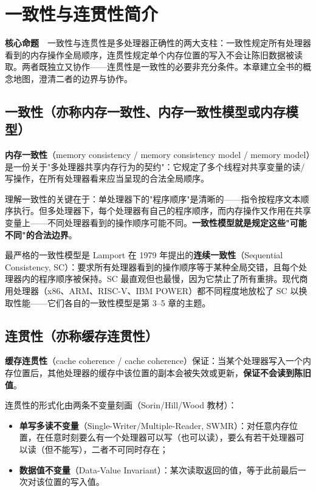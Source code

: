 \chapter{一致性与连贯性简介}

\begin{epigraph}
\textbf{核心命题}　一致性与连贯性是多处理器正确性的两大支柱：一致性规定所有处理器看到的内存操作全局顺序，连贯性规定单个内存位置的写入不会让陈旧数据被读取。两者既独立又协作——连贯性是一致性的必要非充分条件。本章建立全书的概念地图，澄清二者的边界与协作。
\end{epigraph}



\section{一致性（亦称内存一致性、内存一致性模型或内存模型）}

\textbf{内存一致性}（memory consistency / memory consistency model / memory model）是一份关于"多处理器共享内存行为的契约"：它规定了多个线程对共享变量的读/写操作，在所有处理器看来应当呈现的合法全局顺序。

理解一致性的关键在于：单处理器下的"程序顺序"是清晰的——指令按程序文本顺序执行。但多处理器下，每个处理器有自己的程序顺序，而内存操作又作用在共享变量上——不同处理器看到的操作顺序可能不同。\textbf{一致性模型就是规定这些"可能不同"的合法边界}。

最严格的一致性模型是 Lamport 在 1979 年提出的\textbf{连续一致性}（Sequential Consistency, SC）：要求所有处理器看到的操作顺序等于某种全局交错，且每个处理器内的程序顺序被保持。SC 最直观但也最慢，因为它禁止了所有重排。现代商用处理器（x86、ARM、RISC-V、IBM POWER）都不同程度地放松了 SC 以换取性能——它们各自的一致性模型是第 3–5 章的主题。

\section{连贯性（亦称缓存连贯性）}

\textbf{缓存连贯性}（cache coherence / cache coherence）保证：当某个处理器写入一个内存位置后，其他处理器的缓存中该位置的副本会被失效或更新，\textbf{保证不会读到陈旧值}。

连贯性的形式化由两条不变量刻画（Sorin/Hill/Wood 教材）：

\begin{itemize}
\item \textbf{单写多读不变量}（Single-Writer/Multiple-Reader, SWMR）：对任意内存位置，在任意时刻要么有一个处理器可以写（也可以读），要么有若干处理器可以读（但不能写），二者不可同时存在；
\item \textbf{数据值不变量}（Data-Value Invariant）：某次读取返回的值，等于此前最后一次对该位置的写入值。
\end{itemize}


